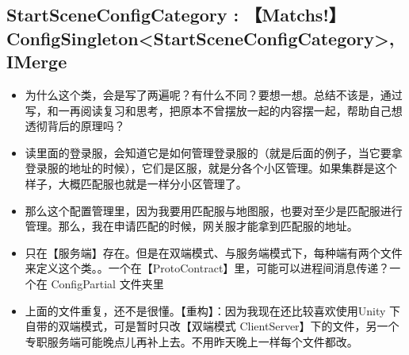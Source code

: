 \documentclass[9pt, b5paper]{article}
\begin{document}
\subsection{StartSceneConfigCategory : 【Matchs!】ConfigSingleton<StartSceneConfigCategory>, IMerge}
\label{sec-8-13}
\begin{itemize}
\item 为什么这个类，会是写了两遍呢？有什么不同？要想一想。总结不该是，通过写，和一再阅读复习和思考，把原本不曾摆放一起的内容摆一起，帮助自己想透彻背后的原理吗？
\item 读里面的登录服，会知道它是如何管理登录服的（就是后面的例子，当它要拿登录服的地址的时候），它们是区服，就是分各个小区管理。如果集群是这个样子，大概匹配服也就是一样分小区管理了。
\item 那么这个配置管理里，因为我要用匹配服与地图服，也要对至少是匹配服进行管理。那么，我在申请匹配的时候，网关服才能拿到匹配服的地址。
\item 只在【服务端】存在。但是在双端模式、与服务端模式下，每种端有两个文件来定义这个类。。一个在【ProtoContract】里，可能可以进程间消息传递？一个在 ConfigPartial 文件夹里
\item 上面的文件重复，还不是很懂。【重构】：因为我现在还比较喜欢使用Unity 下自带的双端模式，可是暂时只改【双端模式 ClientServer】下的文件，另一个专职服务端可能晚点儿再补上去。不用昨天晚上一样每个文件都改。
\end{itemize}
\end{document}
